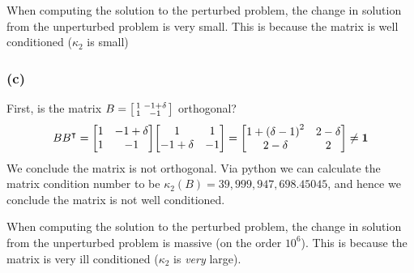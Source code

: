 \documentclass[boxes,pages]{homework}
\newcommand{\tpose}[1]{#1^\intercal}
\begin{document}
\begin{solution}
	When computing the solution to the perturbed problem, the change in solution from the unperturbed problem is very small. This is because the matrix is well conditioned ($\kappa_2$ is small)

	\subsubsection*{(c)}
	First, is the matrix $B = \smqty[1 & -1 + \delta \\ 1 & -1]$ orthogonal?
	\begin{equation*}
		B\tpose{B} = \mqty[1 & -1 + \delta \\ 1 & -1]\mqty[1 & 1 \\ -1 + \delta & -1] = \mqty[1 + \qty(\delta - 1)^2 & 2 - \delta \\ 2 - \delta & 2] \neq \mathbf{1}
	\end{equation*}
	We conclude the matrix is not orthogonal. Via python we can calculate the matrix condition number to be $\kappa_2(B) = 39,999,947,698.45045$, and hence we conclude the matrix is not well conditioned.

	When computing the solution to the perturbed problem, the change in solution from the unperturbed problem is massive (on the order $10^6$). This is because the matrix is very ill conditioned ($\kappa_2$ is \emph{very} large).

\end{solution}
\end{document}
